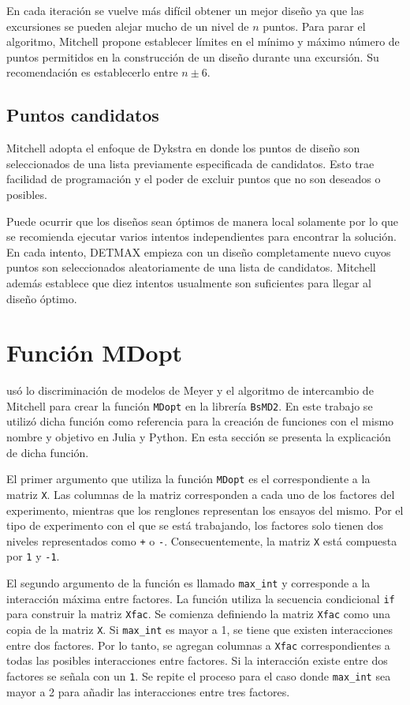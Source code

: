 En cada iteración se vuelve más difícil obtener un mejor diseño ya que las excursiones se pueden alejar mucho de un nivel de $n$ puntos. Para parar el algoritmo, Mitchell propone establecer límites en el mínimo y máximo número de puntos permitidos en la construcción de un diseño durante una excursión. Su recomendación es establecerlo entre $n \pm 6$. 

\subsection{Puntos candidatos}

Mitchell adopta el enfoque de Dykstra  en donde los puntos de diseño son seleccionados de una lista previamente especificada de candidatos. Esto trae facilidad de programación y el poder de excluir puntos que no son deseados o posibles. 

Puede ocurrir que los diseños sean óptimos de manera local solamente por lo que se recomienda ejecutar varios intentos independientes para encontrar la solución. En cada intento, DETMAX empieza con un diseño completamente nuevo cuyos puntos son seleccionados aleatoriamente de una lista de candidatos. Mitchell además establece que diez intentos usualmente son suficientes para llegar al diseño óptimo. 

\section{Función MDopt}
\cite{tesis_paty} usó lo discriminación de modelos de Meyer y el algoritmo de intercambio de Mitchell para crear la función \texttt{MDopt} en la librería \texttt{BsMD2}. En este trabajo se utilizó dicha función como referencia para la creación de funciones con el mismo nombre y objetivo en \textsf{Julia} y \textsf{Python}. En esta sección se presenta la explicación de dicha función. 

El primer argumento que utiliza la función \texttt{MDopt} es el correspondiente a la matriz \texttt{X}. Las columnas de la matriz corresponden a cada uno de los factores del experimento, mientras que los renglones representan los ensayos del mismo. Por el tipo de experimento con el que se está trabajando, los factores solo tienen dos niveles representados como \texttt{+} o \texttt{-}. Consecuentemente, la matriz \texttt{X} está compuesta por \texttt{1} y  \texttt{-1}. 

El segundo argumento de la función es llamado \texttt{max\_int} y corresponde a la interacción máxima entre factores. La función utiliza la secuencia condicional \texttt{if} para construir la matriz \texttt{Xfac}. Se comienza definiendo la matriz \texttt{Xfac} como una copia de la matriz \texttt{X}. Si \texttt{max\_int} es mayor a 1, se tiene que existen interacciones entre dos factores. Por lo tanto, se agregan columnas a \texttt{Xfac} correspondientes a todas las posibles interacciones entre factores. Si la interacción existe entre dos factores se señala con un \texttt{1}. Se repite el proceso para el caso donde \texttt{max\_int} sea mayor a 2 para añadir las interacciones entre tres factores. 

